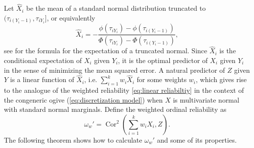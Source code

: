 \documentclass[twoside]{article}
\DeclareMathOperator{\Cor}{Cor}
\begin{document}
Let $\hat{X}_{i}$ be the mean of a standard normal distribution
truncated to $(\tau_{i(Y_{i}-1)},\tau_{iY_{i}}]$, or equivalently
\begin{equation}
\hat{X}_{i}=-\frac{\phi(\tau_{iY_{i}})-\phi(\tau_{i(Y_{i}-1)})}{\Phi(\tau_{iY_{i}})-\Phi(\tau_{i(Y_{i}-1)})},\label{eq:Predictor of X}
\end{equation}
see \citep[Section 10.1]{Johnson1994-ag} for the formula for the
expectation of a truncated normal. Since $\hat{X}_{i}$ is the
conditional expectation of $X_{i}$ given $Y_{i}$, it is the optimal
predictor of $X_{i}$ given $Y_{i}$ in the sense of minimizing the
mean squared error. A natural predictor of $Z$ given $Y$ is a linear
function of $\hat{X}_{i}$, i.e. $\sum_{i=1}^{k}w_{i}\hat{X}_{i}$
for some weights $w_{i}$, which gives rise to the analogue of the
weighted reliability \eqref{eq:linear reliabiltiy} in the context of the congeneric ogive
(\ref{eq:discretization model}) when $X$ is multivariate normal
with standard normal marginals. Define the weighted ordinal reliability
as
\begin{equation}
\omega_{w}'=\Cor^{2}\left(\sum_{i=1}^{k}w_{i}\hat{X}_{i},Z\right).\label{eq:Weighted ordinal reliability}
\end{equation}
The following theorem shows how to calculate $\omega_{w}'$ and
some of its properties.
\end{document}
